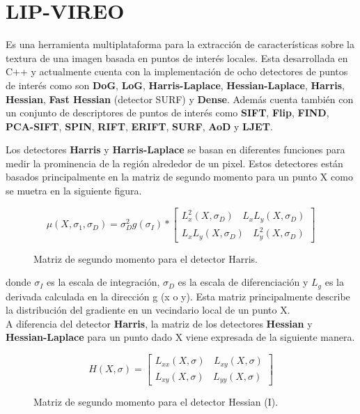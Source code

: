 
\section{LIP-VIREO}

Es una herramienta multiplataforma para la extracción de características sobre la textura de una imagen basada en puntos de interés locales. Esta desarrollada en C++ y actualmente cuenta con la implementación de ocho detectores de puntos de interés como son \textbf{DoG}, \textbf{LoG}, \textbf{Harris-Laplace}, \textbf{Hessian-Laplace}, \textbf{Harris}, \textbf{Hessian}, \textbf{Fast Hessian} (detector SURF) y \textbf{Dense}. Además cuenta también con un conjunto de descriptores de puntos de interés como \textbf{SIFT}, \textbf{Flip}, \textbf{FIND}, \textbf{PCA-SIFT}, \textbf{SPIN}, \textbf{RIFT}, \textbf{ERIFT}, \textbf{SURF}, \textbf{AoD} y \textbf{LJET}.

Los detectores \textbf{Harris} y \textbf{Harris-Laplace} se basan en diferentes funciones para medir la prominencia de la región alrededor de un pixel. Estos detectores están basados principalmente en la matriz de segundo momento para un punto X como se muetra en la siguiente figura.

\begin{figure}[htbp]
\centering
\[
\mu \left ( X,\sigma _{1},  \sigma _{D}\right ) = \sigma ^{2}_{D}g(\sigma _{I}) * \begin{bmatrix}
L^{2}_{x}(X,\sigma _{D}) \:\:\:\: L_{x}L_{y}(X,\sigma _{D}) \\
L_{x}L_{y}(X,\sigma _{D}) \:\:\:\: L^{2}_{y}(X,\sigma _{D})
\end{bmatrix}
\] 
\caption{Matriz de segundo momento para el detector Harris.} 
\end{figure}

donde $\sigma _{I}$ es la escala de integración, $\sigma _{D}$ es la escala de diferenciación y $L_{g}$ es la derivada calculada en la dirección g (x o y). Esta matriz principalmente describe la distribución del gradiente en un vecindario local de un punto X. \\

A diferencia del detector \textbf{Harris}, la matriz de los detectores \textbf{Hessian} y \textbf{Hessian-Laplace} para un punto dado X viene expresada de la siguiente manera. \\

\begin{figure}[htbp]
\centering
\[
H( X,  \sigma) = 
\begin{bmatrix}
L_{xx}(X,\sigma) \:\:\:\: L_{xy}(X,\sigma) \\
L_{xy}(X,\sigma) \:\:\:\: L_{yy}(X,\sigma)
\end{bmatrix}
\]
\caption{Matriz de segundo momento para el detector Hessian (I).} 
\end{figure}

